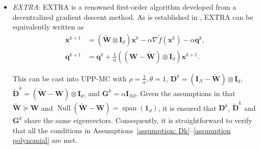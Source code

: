 \documentclass[12pt,draftcls,onecolumn]{IEEEtran}
\renewcommand{\Re}{{\mathbb{R}}}
\newcommand{\bG}{{\mathbf{G}}}
\newcommand{\bI}{{\mathbf{I}}}
\newcommand{\bD}{{\mathbf{D}}}
\newcommand{\bW}{{\mathbf{W}}}
\begin{document}
\begin{itemize}
	\item[1)] \label{analysis extra} \textit{EXTRA}: EXTRA \cite{shi_extra_2015} is a renowned first-order algorithm developed from a decentralized gradient descent method. As is established in \cite{Wu2020AUA}, EXTRA can be equivalently written as
	\begin{align}
		  \label{EXTRA primal 1}\mathbf{x}^{k+1} &= (\tilde{\bW} \otimes \bI_d) \mathbf{x}^k - \alpha \nabla \tilde{f}(\mathbf{x}^k) - \alpha \mathbf{q}^k, \\
		  \label{EXTRA primal 2}\mathbf{q}^{k+1} &= \mathbf{q}^k + \frac{1}{\alpha} ((\bW - \tilde{\bW})\otimes \bI_d) \mathbf{x}^{k+1}.
	\end{align}

	This can be cast into UPP-MC with $\rho = \frac{1}{\alpha},\theta=1$, $\bD^k=(\bI_N-\tilde{\bW})\otimes \bI_d$, $\tilde{\bD}^k=(\tilde{\bW}-\bW)\otimes \bI_d$, and $\bG^k=\alpha\bI_{Nd}$. Given the assumptions in \cite{shi_extra_2015} that $\tilde{\bW} \succeq \bW$ and $\operatorname{Null}(\tilde{\bW} - \bW) = \operatorname{span}(\mathbf{1}_d)$, it is ensured that $\bD^k$, $\tilde{\bD}^k$ and $\bG^k$ share the same eigenvectors. Consequently, it is straightforward to verify that all the conditions in Assumptions~\ref{assumption: Dk}--\ref{assumption polynomial} are met.


\end{itemize}
\end{document}
